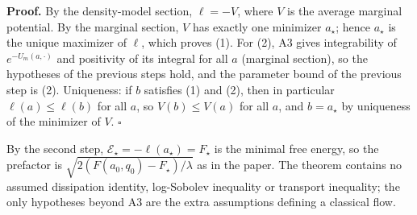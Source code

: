 \documentclass[11pt,a4paper]{report}
\begin{document}
\textbf{Proof.} By the density-model section, \(\ell=-V\), where \(V\) is the average marginal potential. By the marginal section, \(V\) has exactly one minimizer \(a_\star\); hence \(a_\star\) is the unique maximizer of \(\ell\), which proves (1). For (2), A3 gives integrability of \(e^{-U_m(a,\cdot)}\) and positivity of its integral for all \(a\) (marginal section), so the hypotheses of the previous steps hold, and the parameter bound of the previous step is (2). Uniqueness: if \(b\) satisfies (1) and (2), then in particular \(\ell(a)\le\ell(b)\) for all \(a\), so \(V(b)\le V(a)\) for all \(a\), and \(b=a_\star\) by uniqueness of the minimizer of \(V\). \(\square\)




By the second step, \(\mathcal E_\star=-\ell(a_\star)=F_\star\) is the minimal free energy, so the prefactor is \(\sqrt{2(F(a_0,q_0)-F_\star)/\lambda}\) as in the paper. The theorem contains no assumed dissipation identity, log-Sobolev inequality or transport inequality; the only hypotheses beyond A3 are the extra assumptions defining a classical flow.
\end{document}

